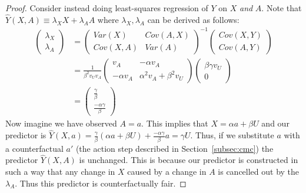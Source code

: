 \begin{proof}
Consider instead doing least-squares regression of $Y$ on $X$
\emph{and} $A$. Note that $\hat Y(X,A) \equiv \lambda_X X + \lambda_A
A$ where $\lambda_X,\lambda_A$ can be derived as follows:
\begin{align}
\begin{pmatrix}
\lambda_X \\
\lambda_A
\end{pmatrix} &=
\begin{pmatrix}
Var(X) & Cov(A,X) \\
Cov(X,A) & Var(A)
\end{pmatrix}^{-1}
\begin{pmatrix}
Cov(X,Y) \\
Cov(A,Y)
\end{pmatrix} \nonumber \\
&=
\frac{1}{\beta^2 v_U v_A}
\begin{pmatrix}
v_A & -\alpha v_A \\
-\alpha v_A & \alpha^2 v_A + \beta^2 v_U
\end{pmatrix}
\begin{pmatrix}
\beta \gamma v_U \\
0
\end{pmatrix} \nonumber \\
&=
\begin{pmatrix}
\frac{\gamma}{\beta} \\
\frac{-\alpha\gamma}{\beta}
\end{pmatrix}
\end{align}
Now imagine we have observed $A\!=\!a$. This implies that $X = \alpha
a + \beta U$ and our predictor is $\hat Y(X,a) =
\frac{\gamma}{\beta}(\alpha a + \beta U) + \frac{-\alpha\gamma}{\beta}
a = \gamma U$. Thus, if we substitute $a$ with a counterfactual $a'$
(the action step described in Section~\ref{subsec:cmc}) the predictor
$\hat Y(X,A)$ is unchanged. This is because our predictor is
constructed in such a way that any change in $X$ caused by a change in
$A$ is cancelled out by the $\lambda_A$. Thus this predictor is
counterfactually fair.
\end{proof}

